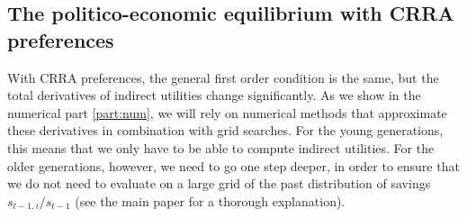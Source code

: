 \documentclass[a4paper]{article}
\begin{document}
\subsection{The politico-economic equilibrium with CRRA preferences}\label{\refsec:PEE}
With CRRA preferences, the general first order condition is the same, but the total derivatives of indirect utilities change significantly. As we show in the numerical part \ref{part:num}, we will rely on numerical methods that approximate these derivatives in combination with grid searches. For the young generations, this means that we only have to be able to compute indirect utilities. For the older generations, however, we need to go one step deeper, in order to ensure that we do not need to evaluate on a large grid of the past distribution of savings $s_{t-1,i}/s_{t-1}$ (see the main paper for a thorough explanation). 
\end{document}
